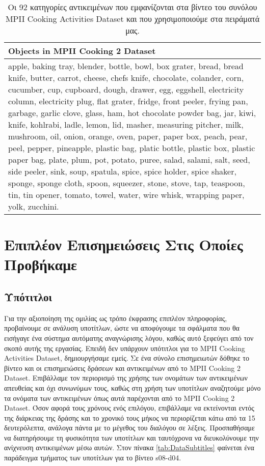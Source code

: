 \begin{table}
    \begin{tabular}{|p{13.55cm}|}
    \hline
    Objects in MPII Cooking 2 Dataset \\ \hline
    apple, baking tray, blender, bottle, bowl, box grater, bread, bread knife, butter, carrot, cheese, chefs knife, chocolate, colander, corn, cucumber, cup, cupboard, dough, drawer, egg, eggshell, electricity column, electricity plug, flat grater, fridge, front peeler, frying pan, garbage, garlic clove, glass, ham, hot chocolate powder bag, jar, kiwi, knife, kohlrabi, ladle, lemon, lid, masher, measuring pitcher, milk, mushroom, oil, onion, orange, oven, paper, paper box, peach, pear, peel, pepper, pineapple, plastic bag, platic bottle, plastic box, plastic paper bag, plate, plum, pot, potato, puree, salad, salami, salt, seed, side peeler, sink, soup, spatula, spice, spice holder, spice shaker, sponge, sponge cloth, spoon, squeezer, stone, stove, tap, teaspoon, tin, tin opener, tomato, towel, water, wire whisk, wrapping paper, yolk, zucchini. \\
    \hline
    \end{tabular}
	\caption{Οι 92 κατηγορίες αντικειμένων που εμφανίζονται στα βίντεο του συνόλου MPII Cooking Activities Dataset και που χρησιμοποιούμε στα πειράματά μας.}
	\label{tab:DataNouns}
\end{table}


\section{Επιπλέον Επισημειώσεις Στις Οποίες Προβήκαμε}
\subsection{Υπότιτλοι}
Για την αξιοποίηση της ομιλίας ως τρόπο έκφρασης επιπλέον πληροφορίας, προβαίνουμε σε ανάλυση υποτίτλων, ώστε να αποφύγουμε τα σφάλματα που θα εισήγαγε ένα σύστημα αυτόματης αναγνώρισης λόγου, καθώς αυτό ξεφεύγει από τον σκοπό αυτής της εργασίας. Επειδή δεν υπάρχουν υπότιτλοι για το MPII Cooking Activities Dataset, δημιουργήσαμε εμείς. Σε ένα σύνολο επισημειωτών δόθηκε το βίντεο και οι επισημειώσεις δράσεων και αντικειμένων από το MPII Cooking 2 Dataset. Επιβάλλαμε τον περιορισμό της χρήσης των ονομάτων των αντικειμένων απευθείας και όχι συνωνύμων τους, καθώς στη χρήση των υποτίτλων αναζητούμε μόνο τα ονόματα των αντικειμένων όπως αυτά παρέχονται από το MPII Cooking 2 Dataset. Όσον αφορά τους χρόνους ενός επιλόγου, επιβάλλαμε να εκτείνονται εντός της διάρκειας της δράσης και το χρονικό τους μήκος να περιορίζεται κάτω από τα 15 δευτερόλεπτα, ανάλογα πάντα με το μέγεθος του διαλόγου σε λέξεις. Προσπαθήσαμε να διατηρήσουμε τη φυσικότητα των υποτίτλων και ταυτόχρονα να διευκολύνουμε την ανίχνευση αντικειμένων μέσω αυτών. Στον πίνακα \ref{tab:DataSubtitles} φαίνεται ένα παράδειγμα τμήματος των υποτίτλων για το βίντεο s08-d04.

